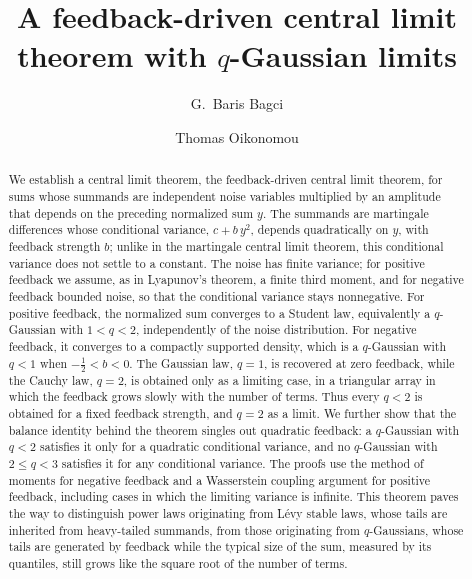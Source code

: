\documentclass[aip,jmp,preprint,onecolumn,floatfix,superscriptaddress,nofootinbib,11pt]{revtex4-2}
\theoremstyle{plain}
\theoremstyle{remark}
\numberwithin{equation}{section}
\begin{document}
\title{A feedback-driven central limit theorem with $q$-Gaussian limits}

\author{G.~Baris Bagci}
\author{Thomas Oikonomou}

\begin{abstract}
We establish a central limit theorem, the feedback-driven central limit theorem, for sums whose summands are independent noise variables multiplied by an amplitude that depends on the preceding normalized sum $y$. The summands are martingale differences whose conditional variance, $c+b\,y^{2}$, depends quadratically on $y$, with feedback strength $b$; unlike in the martingale central limit theorem, this conditional variance does not settle to a constant. The noise has finite variance; for positive feedback we assume, as in Lyapunov's theorem, a finite third moment, and for negative feedback bounded noise, so that the conditional variance stays nonnegative. For positive feedback, the normalized sum converges to a Student law, equivalently a $q$-Gaussian with $1<q<2$, independently of the noise distribution. For negative feedback, it converges to a compactly supported density, which is a $q$-Gaussian with $q<1$ when $-\tfrac12<b<0$. The Gaussian law, $q=1$, is recovered at zero feedback, while the Cauchy law, $q=2$, is obtained only as a limiting case, in a triangular array in which the feedback grows slowly with the number of terms. Thus every $q<2$ is obtained for a fixed feedback strength, and $q=2$ as a limit. We further show that the balance identity behind the theorem singles out quadratic feedback: a $q$-Gaussian with $q<2$ satisfies it only for a quadratic conditional variance, and no $q$-Gaussian with $2\le q<3$ satisfies it for any conditional variance. The proofs use the method of moments for negative feedback and a Wasserstein coupling argument for positive feedback, including cases in which the limiting variance is infinite. This theorem paves the way to distinguish power laws originating from L\'evy stable laws, whose tails are inherited from heavy-tailed summands, from those originating from $q$-Gaussians, whose tails are generated by feedback while the typical size of the sum, measured by its quantiles, still grows like the square root of the number of terms.
\end{abstract}
\end{document}
